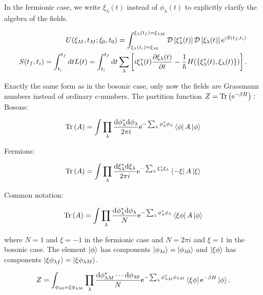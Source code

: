 In the fermionic case, we write $\xi_{\lambda}(t)$ instead of $\phi_{\lambda}(t)$ to explicitly clarify the algebra of the fields. 

\begin{align*}
    U(\xi_{M} ,t_{M} ; \xi_{0}, t_{0}) = \int_{\xi_{\lambda}(t_{i}) = \xi_{\lambda 0}}^{\xi_{\lambda}(t_{f}) = \xi_{\lambda M}} \mathcal{D} \left[\xi_{\lambda}^{*}(t)\right] \mathcal{D} \left[ \xi_{\lambda} (t)\right] \mathrm{e}^{iS(t_{f}, t_{i})} \\
    S(t_{f}, t_{i}) = \int_{t_{i}}^{t_{f}} \dd t L(t) = \int_{t_{i}}^{t_{f}} \dd t \sum_{\lambda} \left[ i \xi_{\lambda}^{*}(t) \pdv{\xi_{\lambda}(t)}{t} - \frac{1}{\hbar}H(\{\xi_{\lambda}^{*}(t), \xi_{\lambda} (t)\} )  \right].
\end{align*}

Exactly the same form as in the bosonic case, only now the fields are Grassmann numbers instead of ordinary c-numbers. The partition function $Z = \Tr \left( \mathrm{e}^{-\beta H} \right): 
$
Bosons: 

\begin{equation*}
    \Tr \left( A \right) = \int \prod_{\lambda}  \frac{\dd \phi_{\lambda }^{*} \dd \phi_{\lambda }}{2\pi i} \mathrm{e}^{-\sum_{\lambda} \phi_{\lambda}^{*}\phi_{\lambda}} \bra{\phi}A \ket{\phi}
\end{equation*}

Fermions: 

\begin{equation*}
    \Tr \left( A \right) = \int \prod_{\lambda} \frac{\dd \xi_{\lambda }^{*} \dd \xi_{\lambda }}{2\pi i} \mathrm{e}^{-\sum_{\lambda} \xi_{\lambda}^{*}\xi_{\lambda}} \bra{-\xi}A \ket{\xi}
\end{equation*}

Common notation: 

\begin{align*}
    \Tr \left( A \right) = \int \prod_{\lambda}  \frac{\dd \phi_{\lambda }^{*} \dd \phi_{\lambda }}{N} \mathrm{e}^{-\sum_{\lambda} \phi_{\lambda}^{*}\phi_{\lambda}} \bra{\xi \phi}A \ket{\phi}
\end{align*}

where $N = 1$ and $\xi = -1$ in the fermionic case and $N = 2\pi i$ and $\xi = 1$ in the bosonic case. The element $\ket{\phi}$ has components $\ket{\phi_{\lambda i}} = \ket{\phi_{\lambda 0}}$ and $\ket{\xi \phi}$ has components $\ket{\xi \phi_{\lambda f}} = \ket{\xi \phi_{\lambda M}}$. 

\begin{equation*}
    Z = \int_{\phi_{\lambda 0} = \xi \phi_{\lambda M}} \prod_{\lambda}  \frac{\dd \phi_{\lambda M}^{*}  \cdots \dd \phi_{\lambda 0}}{N} \mathrm{e}^{-\sum_{\lambda} \phi_{\lambda M}^{*}\phi_{\lambda M}} \bra{\xi \phi} \mathrm{e}^{-\beta H} \ket{\phi}. 
\end{equation*}

